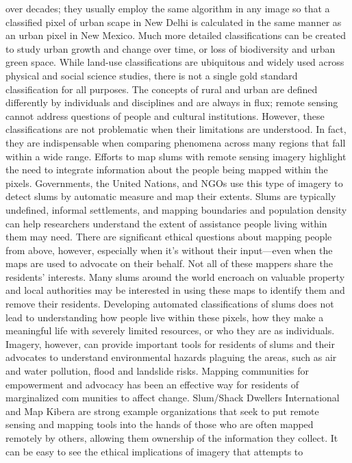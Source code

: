 over decades; they usually employ the same algorithm in any image so that
a classified pixel of urban scape in New Delhi is calculated in the same manner
as an urban pixel in New Mexico. Much more detailed classifications
can be created to study urban growth and change over time, or loss of biodiversity
and urban green space.
While land-use classifications are ubiquitous and widely used across physical
and social science studies, there is not a single gold standard classification
for all purposes. The concepts of rural and urban are defined differently
by individuals and disciplines and are always in flux; remote sensing cannot
address questions of people and cultural institutions. However, these classifications
are not problematic when their limitations are understood. In fact,
they are indispensable when comparing phenomena across many regions
that fall within a wide range.
Efforts to map slums with remote sensing imagery highlight the need to
integrate information about the people being mapped within the pixels.
Governments, the United Nations, and NGOs use this type of imagery to
detect slums by automatic measure and map their extents. Slums are typically
undefined, informal settlements, and mapping boundaries and population
density can help researchers understand the extent of assistance people
living within them may need. There are significant ethical questions about
mapping people from above, however, especially when it's without their
input—even when the maps are used to advocate on their behalf. Not all of
these mappers share the residents' interests. Many slums around the world
encroach on valuable property and local authorities may be interested in
using these maps to identify them and remove their residents. Developing
automated classifications of slums does not lead to understanding how people
live within these pixels, how they make a meaningful life with severely
limited resources, or who they are as individuals. Imagery, however, can
provide important tools for residents of slums and their advocates to understand
environmental hazards plaguing the areas, such as air and water pollution,
flood and landslide risks. Mapping communities for empowerment
and advocacy has been an effective way for residents of marginalized com
munities to affect change. Slum/Shack Dwellers International and Map
Kibera are strong example organizations that seek to put remote sensing
and mapping tools into the hands of those who are often mapped remotely
by others, allowing them ownership of the information they collect.
It can be easy to see the ethical implications of imagery that attempts to
